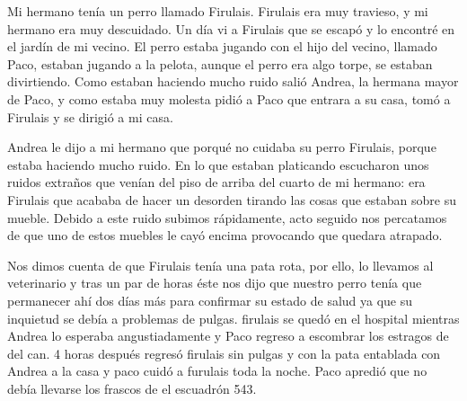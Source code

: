 \documentclass{article}
\begin{document}
Mi hermano tenía un perro llamado Firulais. Firulais era muy travieso, y mi hermano era muy descuidado. Un día vi a Firulais que se escapó y lo encontré en el jardín de mi vecino.
El perro estaba jugando con el hijo del vecino, llamado Paco, estaban jugando a la pelota, aunque el perro era algo torpe, se estaban divirtiendo. Como estaban haciendo mucho ruido salió Andrea, la hermana mayor de Paco, y como estaba muy molesta pidió a Paco que entrara a su casa, tomó a Firulais y se dirigió a mi casa.

Andrea le dijo a mi hermano que porqué no cuidaba su perro Firulais, porque estaba haciendo mucho ruido. En lo que estaban platicando escucharon unos ruidos extraños que venían del piso de arriba del cuarto de mi hermano: era Firulais que acababa de hacer un desorden tirando las cosas que estaban sobre su mueble. Debido a este ruido subimos rápidamente, acto seguido nos percatamos de que uno de estos muebles le cayó encima provocando que quedara atrapado.

Nos dimos cuenta de que Firulais tenía una pata rota, por ello, lo llevamos al veterinario y tras un par de horas éste nos dijo que nuestro perro tenía que permanecer ahí dos días más para confirmar su estado de salud ya que su inquietud se debía a problemas de pulgas. firulais se quedó en el hospital mientras Andrea lo esperaba angustiadamente y Paco  regreso a escombrar los estragos de del can. 
4 horas después regresó firulais sin pulgas y con la pata entablada con Andrea a la casa y paco cuidó a furulais toda la noche. Paco apredió que no debía llevarse los frascos de el escuadrón 543.  
\end{document}
